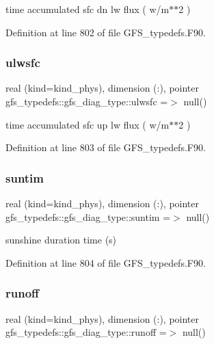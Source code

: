time accumulated sfc dn lw flux ( w/m$\ast$$\ast$2 ) 



Definition at line 802 of file G\+F\+S\+\_\+typedefs.\+F90.

\mbox{\label{structgfs__typedefs_1_1gfs__diag__type_a576bccbb8270fbcc4665cb22567b48ba}} 
\subsubsection{ulwsfc}
{\footnotesize\ttfamily real (kind=kind\+\_\+phys), dimension (\+:), pointer gfs\+\_\+typedefs\+::gfs\+\_\+diag\+\_\+type\+::ulwsfc =$>$ null()}



time accumulated sfc up lw flux ( w/m$\ast$$\ast$2 ) 



Definition at line 803 of file G\+F\+S\+\_\+typedefs.\+F90.

\mbox{\label{structgfs__typedefs_1_1gfs__diag__type_aa712e733d9a37303cbe3e18b9b4c6255}} 
\subsubsection{suntim}
{\footnotesize\ttfamily real (kind=kind\+\_\+phys), dimension (\+:), pointer gfs\+\_\+typedefs\+::gfs\+\_\+diag\+\_\+type\+::suntim =$>$ null()}



sunshine duration time (s) 



Definition at line 804 of file G\+F\+S\+\_\+typedefs.\+F90.

\mbox{\label{structgfs__typedefs_1_1gfs__diag__type_af221435527bdf4048c77d595c76abad3}} 
\subsubsection{runoff}
{\footnotesize\ttfamily real (kind=kind\+\_\+phys), dimension (\+:), pointer gfs\+\_\+typedefs\+::gfs\+\_\+diag\+\_\+type\+::runoff =$>$ null()}



